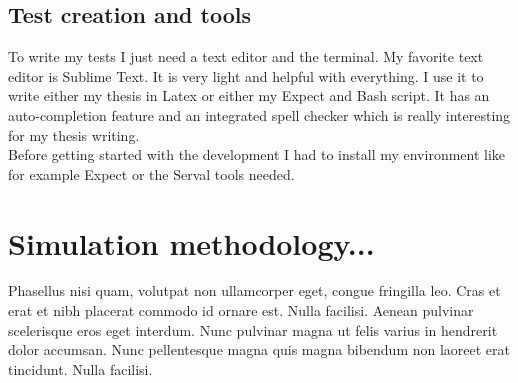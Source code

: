 \subsection{Test creation and tools}
To write my tests I just need a text editor and the terminal. My favorite text editor is Sublime Text. It is very light and helpful with everything. I use it to write either my thesis in Latex or either my Expect and Bash script. It has an auto-completion feature and an integrated spell checker which is really interesting for my thesis writing. 
\\
Before getting started with the development I had to install my environment like for example Expect or the Serval tools needed.  

\section{Simulation methodology...}

Phasellus nisi quam, volutpat non ullamcorper eget, congue fringilla leo. Cras et erat et nibh placerat commodo id ornare est. Nulla facilisi. Aenean pulvinar scelerisque eros eget interdum. Nunc pulvinar magna ut felis varius in hendrerit dolor accumsan. Nunc pellentesque magna quis magna bibendum non laoreet erat tincidunt. Nulla facilisi.
